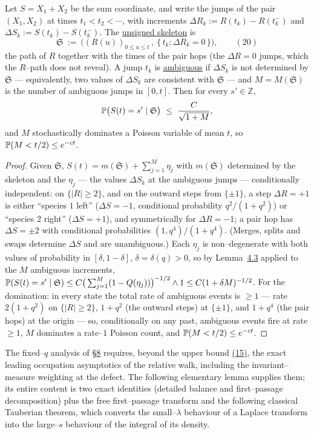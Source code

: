 \documentclass[11pt]{article}
\theoremstyle{plain}
\theoremstyle{definition}
\theoremstyle{remark}
\newcommand{\Z}{\mathbb{Z}}\newcommand{\R}{\mathbb{R}}\newcommand{\N}{\mathbb{N}}
\begin{document}
Let $S=X_1+X_2$ be the sum coordinate, and write the jumps of the pair $(X_1,X_2)$ at
times $t_1<t_2<\cdots$, with increments $\Delta R_k:=R(t_k)-R(t_k^-)$ and
$\Delta S_k:=S(t_k)-S(t_k^-)$. The \underline{unsigned skeleton} is
\label{eq_skeleton}
\begin{equation}
  \mathfrak S\ :=\ \Big((R(u))_{0\le u\le t}\,,\ \{\,t_k:\Delta R_k=0\,\}\Big),\qquad(20)
\end{equation}
the path of $R$ together with the times of the pair hops (the $\Delta R=0$ jumps, which
the $R$--path does not reveal). A jump $t_k$ is \underline{ambiguous} if $\Delta S_k$ is not
determined by $\mathfrak S$ --- equivalently, two values of $\Delta S_k$ are consistent
with $\mathfrak S$ --- and $M=M(\mathfrak S)$ is the number of ambiguous jumps in
$[0,t]$. Then for every $s'\in\Z$,
\[
  \PP\big(S(t)=s'\mid \mathfrak S\big)\ \le\ \frac{C}{\sqrt{1+M}},
\]
and $M$ stochastically dominates a Poisson variable of mean $t$, so
$\mathbb{P}(M<t/2)\le e^{-ct}$.
\par
\begin{proof}
Given $\mathfrak S$, $S(t)=m(\mathfrak S)+\sum_{j=1}^M\eta_j$ with $m(\mathfrak S)$
determined by the skeleton and the $\eta_j$ --- the values $\Delta S_k$ at the
ambiguous jumps --- conditionally independent: on
$\{|R|\ge2\}$, and on the outward steps from $\{\pm1\}$, a step $\Delta R=+1$ is
either ``species $1$ left'' ($\Delta S=-1$, conditional probability $q^2/(1+q^2)$) or
``species $2$ right'' ($\Delta S=+1$), and symmetrically for $\Delta R=-1$; a pair
hop has $\Delta S=\pm2$ with conditional probabilities $(1,q^4)/(1+q^4)$. (Merges,
splits and swaps determine $\Delta S$ and are unambiguous.) Each $\eta_j$ is
non--degenerate with both values of probability in $[\delta,1-\delta]$,
$\delta=\delta(q)>0$, so by Lemma~\hyperref[lem_KR]{4.3} applied to the $M$ ambiguous increments,
$\mathbb{P}(S(t)=s'\mid\mathfrak S)\le C\big(\sum_{j=1}^M(1-Q(\eta_j))\big)^{-1/2}\wedge1
\le C(1+\delta M)^{-1/2}$. For the domination: in every state the total rate of
ambiguous events is $\ge1$ --- rate $2(1+q^2)$ on $\{|R|\ge2\}$, $1+q^2$ (the outward
steps) at $\{\pm1\}$, and $1+q^4$ (the pair hops) at the origin --- so, conditionally
on any past, ambiguous events fire at rate $\ge1$, $M$ dominates a rate--$1$ Poisson
count, and $\mathbb{P}(M<t/2)\le e^{-ct}$.
\end{proof}

The fixed--$q$ analysis of \S\hyperref[sec_tw]{8} requires, beyond the upper bound
\hyperref[eq_tildeR]{(15)}, the exact leading occupation asymptotics of the relative walk,
including the invariant--measure weighting at the defect. The following elementary
lemma supplies them; its entire content is two exact identities (detailed balance and
first--passage decomposition) plus the free first--passage transform and the following
classical Tauberian theorem, which converts the small--$\lambda$ behaviour of a Laplace
transform into the large--$s$ behaviour of the integral of its density.
\end{document}

